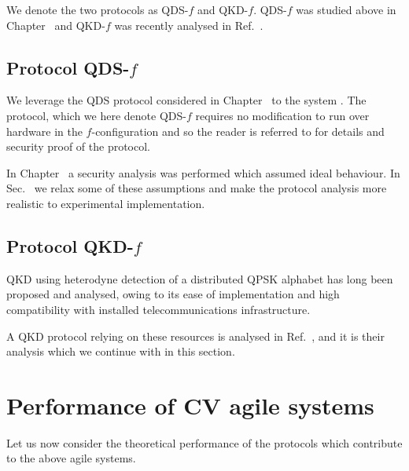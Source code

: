 We denote the two protocols as QDS-$f$ and QKD-$f$. QDS-$f$ was studied above in Chapter~ and QKD-$f$ was recently analysed in Ref.~\cite{Papanastasiou2018}.


\subsection{Protocol QDS-$f$}
We leverage the QDS protocol considered in Chapter~ to the system \systemF. The protocol, which we here denote QDS-$f$ requires no modification to run over hardware in the $f$-configuration and so the reader is referred to  for details and security proof of the protocol. 

In Chapter~ a security analysis was performed which assumed ideal behaviour. In Sec.~ we relax some of these assumptions and make the protocol analysis more realistic to experimental implementation.

\subsection{Protocol QKD-$f$}
QKD using heterodyne detection of a distributed QPSK alphabet has long been proposed and analysed, owing to its ease of implementation and high compatibility with installed telecommunications infrastructure. 

A QKD protocol relying on these resources is analysed in Ref.~\cite{Papanastasiou2018}, and it is their analysis which we continue with in this section. 



\section{Performance of CV agile systems}
Let us now consider the theoretical performance of the protocols which contribute to the above agile systems. 

